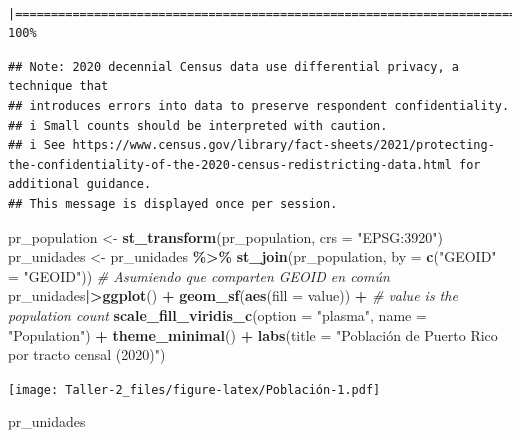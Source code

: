 \documentclass[
]{article}
\newenvironment{Shaded}{\begin{snugshade}}{\end{snugshade}}
\newcommand{\AttributeTok}[1]{\textcolor[rgb]{0.13,0.29,0.53}{#1}}
\newcommand{\CommentTok}[1]{\textcolor[rgb]{0.56,0.35,0.01}{\textit{#1}}}
\newcommand{\FunctionTok}[1]{\textcolor[rgb]{0.13,0.29,0.53}{\textbf{#1}}}
\newcommand{\NormalTok}[1]{#1}
\newcommand{\OtherTok}[1]{\textcolor[rgb]{0.56,0.35,0.01}{#1}}
\newcommand{\SpecialCharTok}[1]{\textcolor[rgb]{0.81,0.36,0.00}{\textbf{#1}}}
\newcommand{\StringTok}[1]{\textcolor[rgb]{0.31,0.60,0.02}{#1}}
\begin{document}
\begin{verbatim}
                                                                   |======================================================================| 100%
\end{verbatim}

\begin{verbatim}
## Note: 2020 decennial Census data use differential privacy, a technique that
## introduces errors into data to preserve respondent confidentiality.
## i Small counts should be interpreted with caution.
## i See https://www.census.gov/library/fact-sheets/2021/protecting-the-confidentiality-of-the-2020-census-redistricting-data.html for additional guidance.
## This message is displayed once per session.
\end{verbatim}

\begin{Shaded}
\begin{Highlighting}[]
\NormalTok{pr\_population }\OtherTok{\textless{}{-}} \FunctionTok{st\_transform}\NormalTok{(pr\_population, }\AttributeTok{crs =} \StringTok{"EPSG:3920"}\NormalTok{)}
\NormalTok{pr\_unidades }\OtherTok{\textless{}{-}}\NormalTok{ pr\_unidades }\SpecialCharTok{\%\textgreater{}\%}
  \FunctionTok{st\_join}\NormalTok{(pr\_population, }\AttributeTok{by =} \FunctionTok{c}\NormalTok{(}\StringTok{"GEOID"} \OtherTok{=} \StringTok{"GEOID"}\NormalTok{))  }\CommentTok{\# Asumiendo que comparten GEOID en común}
\NormalTok{pr\_unidades}\SpecialCharTok{|\textgreater{}}\FunctionTok{ggplot}\NormalTok{() }\SpecialCharTok{+}
  \FunctionTok{geom\_sf}\NormalTok{(}\FunctionTok{aes}\NormalTok{(}\AttributeTok{fill =}\NormalTok{ value)) }\SpecialCharTok{+}  \CommentTok{\# \textasciigrave{}value\textasciigrave{} is the population count}
  \FunctionTok{scale\_fill\_viridis\_c}\NormalTok{(}\AttributeTok{option =} \StringTok{"plasma"}\NormalTok{, }\AttributeTok{name =} \StringTok{"Population"}\NormalTok{) }\SpecialCharTok{+}
  \FunctionTok{theme\_minimal}\NormalTok{() }\SpecialCharTok{+}
  \FunctionTok{labs}\NormalTok{(}\AttributeTok{title =} \StringTok{"Población de Puerto Rico por tracto censal (2020)"}\NormalTok{)}
\end{Highlighting}
\end{Shaded}

\texttt{[image: Taller-2\_files/figure-latex/Población-1.pdf]}

\begin{Shaded}
\begin{Highlighting}[]
\NormalTok{pr\_unidades}
\end{Highlighting}
\end{Shaded}
\end{document}
